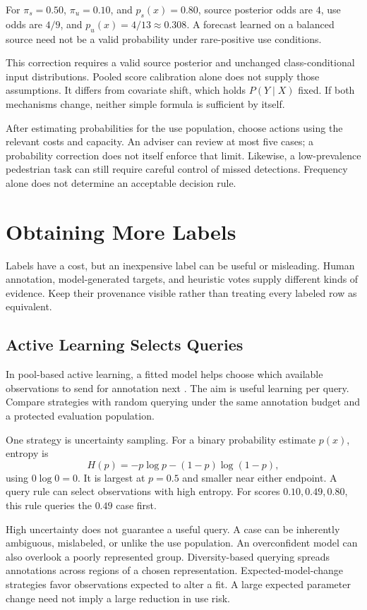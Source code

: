 For $\pi_s=0.50$, $\pi_u=0.10$, and $p_s(x)=0.80$, source posterior odds are $4$, use odds are $4/9$, and $p_u(x)=4/13\approx0.308$. A forecast learned on a balanced source need not be a valid probability under rare-positive use conditions.

This correction requires a valid source posterior and unchanged class-conditional input distributions. Pooled score calibration alone does not supply those assumptions. It differs from covariate shift, which holds $P(Y\mid X)$ fixed. If both mechanisms change, neither simple formula is sufficient by itself.

After estimating probabilities for the use population, choose actions using the relevant costs and capacity. An adviser can review at most five cases; a probability correction does not itself enforce that limit. Likewise, a low-prevalence pedestrian task can still require careful control of missed detections. Frequency alone does not determine an acceptable decision rule.

\section{Obtaining More Labels}

Labels have a cost, but an inexpensive label can be useful or misleading. Human annotation, model-generated targets, and heuristic votes supply different kinds of evidence. Keep their provenance visible rather than treating every labeled row as equivalent.

\subsection{Active Learning Selects Queries}

In pool-based active learning, a fitted model helps choose which available observations to send for annotation next \citep{settles2009}. The aim is useful learning per query. Compare strategies with random querying under the same annotation budget and a protected evaluation population.

One strategy is uncertainty sampling. For a binary probability estimate $p(x)$, entropy is
\[
H(p)=-p\log p-(1-p)\log(1-p),
\]
using $0\log0=0$. It is largest at $p=0.5$ and smaller near either endpoint. A query rule can select observations with high entropy. For scores $0.10,0.49,0.80$, this rule queries the $0.49$ case first.

High uncertainty does not guarantee a useful query. A case can be inherently ambiguous, mislabeled, or unlike the use population. An overconfident model can also overlook a poorly represented group. Diversity-based querying spreads annotations across regions of a chosen representation. Expected-model-change strategies favor observations expected to alter a fit. A large expected parameter change need not imply a large reduction in use risk.

